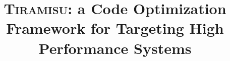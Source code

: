 \documentclass[sigconf, review]{acmart}
\newcommand\framework{\textsc{Tiramisu}\xspace}
\begin{document}
\title{\framework{}: a Code Optimization Framework for   Targeting High Performance Systems}









\end{document}
